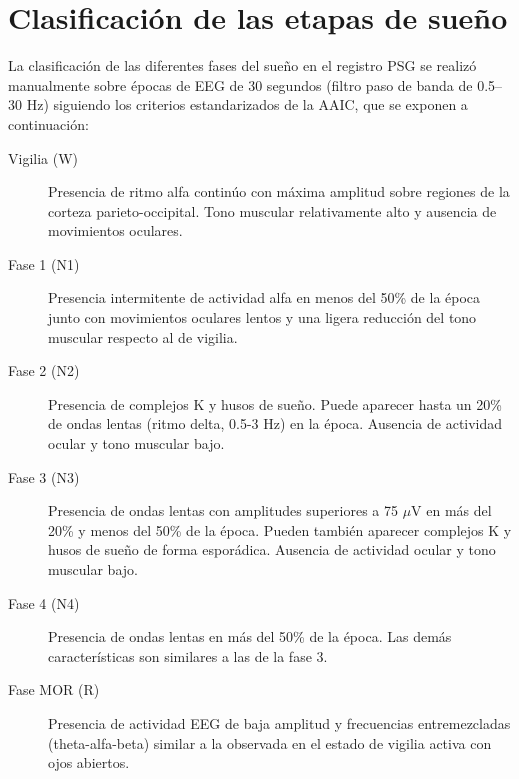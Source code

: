 
\section{Clasificaci\'on de las etapas de sue\~no}

La clasificaci\'on de las diferentes fases del sue\~no en el registro PSG se realiz\'o manualmente 
sobre \'epocas de EEG de 30 segundos (filtro paso de banda de 0.5--30 Hz) siguiendo los criterios 
estandarizados de la AAIC\cite{Hori01}, que se exponen a continuación:
\begin{description}
\item[Vigilia (W)] Presencia de ritmo alfa contin\'uo con m\'axima amplitud 
sobre regiones de la corteza parieto-occipital. Tono muscular relativamente alto y ausencia de 
movimientos oculares.

\item[Fase 1 (N1)] %
Presencia intermitente de 
actividad alfa en menos del 50\% de la \'epoca junto con movimientos oculares lentos y una ligera 
reducci\'on del tono muscular respecto al de vigilia.

\item[Fase 2 (N2)] Presencia de complejos K y husos de sue\~no. Puede aparecer hasta un 20\% de ondas 
lentas (ritmo delta, 0.5-3 Hz) en la \'epoca. Ausencia de actividad ocular y tono muscular bajo.

\item[Fase 3 (N3)] Presencia de ondas lentas con amplitudes superiores a 75 $\mu$V en m\'as del
20\% y menos del 50\% de la \'epoca. Pueden tambi\'en aparecer complejos K y husos de sue\~no de 
forma espor\'adica. Ausencia de actividad ocular y tono muscular bajo.

\item[Fase 4 (N4)] Presencia de ondas lentas en m\'as del 50\% de la época. Las dem\'as 
caracter\'isticas son similares a las de la fase 3.

\item[Fase MOR (R)] Presencia de actividad EEG de baja amplitud y frecuencias entremezcladas 
(theta-alfa-beta) similar a la observada en el estado de vigilia activa con ojos abiertos.
\end{description}



